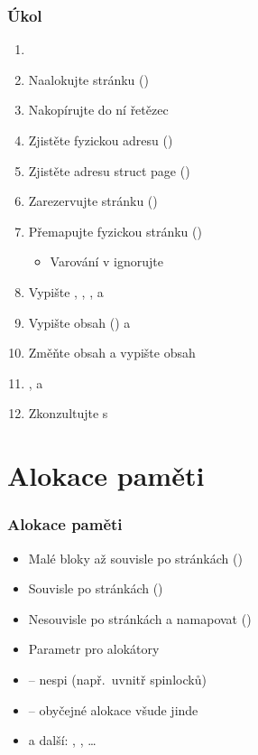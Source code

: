 \begin{frame}
  \frametitle{Úkol}
  
  \begin{enumerate}
  \item {}
  \item Naalokujte stránku ()
  \item Nakopírujte do ní řetězec
  \item Zjistěte fyzickou adresu ()
  \item Zjistěte adresu {struct page} ()
  \item Zarezervujte stránku ()
  \item Přemapujte fyzickou stránku ()
  \begin{itemize}
    \item Varování v  ignorujte
  \end{itemize}
  \item Vypište , , ,  a
  \item Vypište obsah ()  a 
  \item Změňte obsah  a vypište obsah 
  \item {},  a 
  \item Zkonzultujte s 
  \end{enumerate}
\end{frame}

\iffimuni
\section{Alokace paměti}
\frame{\sectionpage}
\fi

\begin{frame}
  \frametitle{Alokace paměti}

  \begin{itemize}[<+->]
    \item Malé bloky až souvisle po stránkách ()
    \item Souvisle po stránkách ()
    \item Nesouvisle po stránkách a namapovat ()
  \end{itemize}

  \pause
  \medskip

  \begin{itemize}
    \item Parametr pro alokátory
    \item {} -- nespi (např.\ uvnitř spinlocků)
    \item {} -- obyčejné alokace všude jinde
    \item a další: , , \dots
  \end{itemize}

\end{frame}

